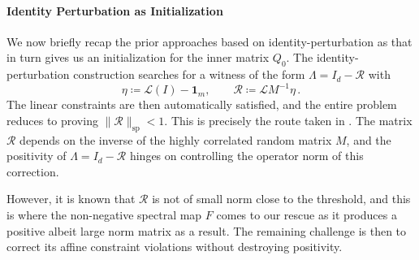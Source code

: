 \documentclass[12pt]{article}
\def\1{\bm{1}}
\newcommand{\calR}{\mathcal{R}}
\newcommand{\calL}{\mathcal{L}}
\newcommand{\Authornote}[3]{{\sf\footnotesize\color{#3}{[#1: #2]}}}
\newcommand{\Authornote}[3]{}
\newcommand{\jnote}[1]{\Authornote{Jeff}{#1}{blue}}
\begin{document}
\paragraph{Identity Perturbation as Initialization}
We now briefly recap the prior approaches based on identity-perturbation as that in turn gives us an initialization for the inner matrix $Q_0$.
The identity-perturbation construction searches for a witness of the
form
\(
    \Lambda
    =
    I_d - \calR  \) with\[
    \eta \coloneqq \calL(I)-\1_m ,
    \qquad
    \calR \coloneqq \calL M^{-1} \eta\,.
    \]
The linear constraints are then automatically satisfied, and the entire problem
reduces to proving
\(
    \|\calR\|_{\mathrm{sp}} < 1.
\)
This is precisely the route taken in \cite{KD22,PTVW22,HKPX23}. The matrix \(\calR\) depends on the inverse of the highly correlated
random matrix \(M\), and the positivity of \(\Lambda=I_d-\calR\) hinges on
controlling the operator norm of this correction. 

However, it is known that $\calR$ is not of small norm close to the threshold, and this is where the non-negative spectral map $F$ comes to our rescue as it produces a positive albeit large norm matrix as a result. The remaining challenge is then to correct its affine constraint violations %
without destroying positivity.

\jnote{im debating on whether to elaborate on the specific correction term here or simply keep it abstract. i'm also ok with the current version in which we fully specify the correction primitive, and mention we are gonna tell u why later.}
\end{document}
